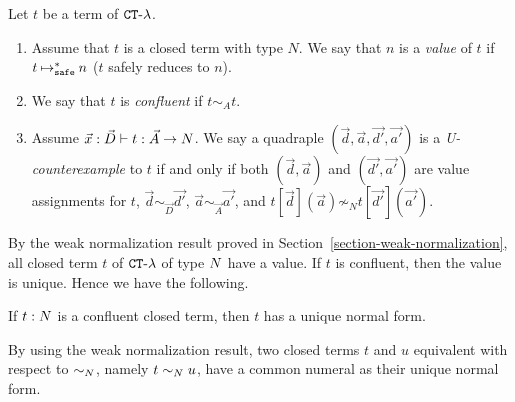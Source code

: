 \begin{definition}
  Let $t$ be a term of ${ {\tt CT} \mbox{-} \lambda}$. 
  \begin{enumerate}
  \item
    Assume that $t$ is a closed term with type $N$. 
    We say that $n$ is a {\em value} of $t$ if $t \mathbin{\mathbin{\mapsto}_{\hbox{\scriptsize \tt safe}}^*} n$ ($t$ safely reduces to $n$). 
  \item
    We say that $t$ is {\em confluent} if $t \sim_A t$.
  \item
    Assume $\vec{x}:\vec{D}\vdash t:\vec{A}\rightarrow{N}$. 
    We say a quadraple $(\vec{d},\vec{a},\vec{d'},\vec{a'})$ is a {\em U-counterexample} to $t$
    if and only if
    both $(\vec{d},\vec{a})$ and $(\vec{d'},\vec{a'})$ are value assignments for $t$, 
    $\vec{d}\sim_{\vec{D}}\vec{d'}$, $\vec{a}\sim_{\vec{A}}\vec{a'}$, and
    $t[\vec{d}](\vec{a}) \not\sim_N t[\vec{d'}](\vec{a'})$. 
  \end{enumerate}
\end{definition}

By the weak normalization result proved in Section~\ref{section-weak-normalization}, all 
closed term $t$ of ${ {\tt CT} \mbox{-} \lambda}$ of type ${N}$ have a value. If $t$ is confluent, then the value is unique.
Hence we have the following. 

\begin{lemma}
  If $t:{N}$ is a confluent closed term, then $t$ has a unique normal form.
\end{lemma}

By using the weak normalization result, 
two closed terms $t$ and $u$ equivalent with respect to $\sim_{N}$, namely $t \sim_{N} u$,
have a common numeral as their unique normal form. 

